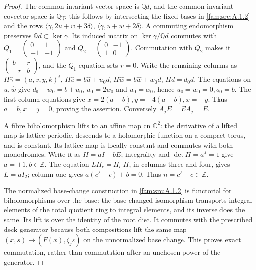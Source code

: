 \begin{proof}
The common invariant vector space is $\mathbb Qd$, and the common invariant covector space is $\mathbb Q\gamma$; this follows by intersecting the fixed bases in \ref{fam:src:A.1.2} and the rows $\langle\gamma,2u+w+3\delta\rangle$, $\langle\gamma,u+w+2\delta\rangle$. A commuting endomorphism preserves $\mathbb Qd\subset\ker\gamma$. Its induced matrix on $\ker\gamma/\mathbb Qd$ commutes with
$Q_1=\left(\begin{smallmatrix}0&1\\-1&-1\end{smallmatrix}\right)$ and $Q_2=\left(\begin{smallmatrix}0&-1\\1&0\end{smallmatrix}\right)$. Commutation with $Q_2$ makes it $\left(\begin{smallmatrix}b&r\\-r&b\end{smallmatrix}\right)$, and the $Q_1$ equation sets $r=0$. Write the remaining columns as
$H\widehat\gamma=(a,x,y,k)^t$, $H\widehat u=b\widehat u+u_0d$, $H\widehat w=b\widehat w+w_0d$, $Hd=d_0d$. The equations on $\widehat u,\widehat w$ give $d_0-w_0=b+u_0$, $u_0=2w_0$ and $u_0=w_0$, hence $u_0=w_0=0,d_0=b$. The first-column equations give $x=2(a-b),y=-4(a-b),x=-y$. Thus $a=b,x=y=0$, proving the assertion. Conversely $A_jE=EA_j=E$.

A fibre biholomorphism lifts to an affine map on $\mathbb C^2$: the derivative of a lifted map is lattice periodic, descends to a holomorphic function on a compact torus, and is constant. Its lattice map is locally constant and commutes with both monodromies. Write it as $H=aI+bE$; integrality and $\det H=a^4=1$ give $a=\pm1,b\in\mathbb Z$. The equation $L\Pi_c=\Pi_{c'}H$, in columns three and four, gives $L=aI_2$; column one gives $a(c'-c)+b=0$. Thus $n=c'-c\in\mathbb Z$.

The normalized base-change construction in \ref{fam:src:A.1.2} is functorial for biholomorphisms over the base: the base-changed isomorphism transports integral elements of the total quotient ring to integral elements, and its inverse does the same. Its lift is over the identity of the root disc. It commutes with the prescribed deck generator because both compositions lift the same map $(x,s)\mapsto(F(x),\zeta_js)$ on the unnormalized base change. This proves exact commutation, rather than commutation after an unchosen power of the generator.


\end{proof}
